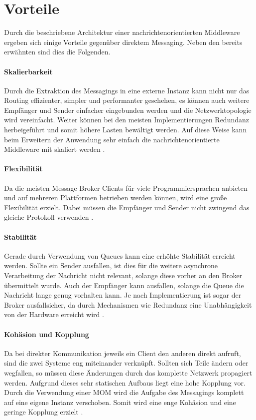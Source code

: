 \label{Message Broker:advantages}
\section{Vorteile}
Durch die beschriebene Architektur einer nachrichtenorientierten Middleware
ergeben sich einige Vorteile gegenüber direktem Messaging. Neben den bereits
erwähnten sind dies die Folgenden.

\paragraph{Skalierbarkeit}
Durch die Extraktion des Messagings in eine externe Instanz kann nicht nur das
Routing effizienter, simpler und performanter geschehen, es können auch weitere
Empfänger und Sender einfacher eingebunden werden und die Netzwerktopologie wird
vereinfacht. Weiter können bei den meisten Implementierungen Redundanz
herbeigeführt und somit höhere Lasten bewältigt werden. Auf diese Weise kann beim
Erweitern der Anwendung sehr einfach die nachrichtenorientierte Middleware mit
skaliert werden \cite{curry2004message}.
\paragraph{Flexibilität}
Da die meisten Message Broker Clients für viele Programmiersprachen anbieten
und auf mehreren Plattformen betrieben werden können, wird eine große Flexibilität
erzielt. Dabei müssen die Empfänger und Sender nicht zwingend das gleiche
Protokoll verwenden \cite{dobbelaere2017kafka}.
\paragraph{Stabilität}
Gerade durch Verwendung von Queues kann eine erhöhte Stabilität erreicht werden.
Sollte ein Sender ausfallen, ist dies für die weitere asynchrone Verarbeitung
der Nachricht nicht relevant, solange diese vorher an den Broker übermittelt
wurde. Auch der Empfänger kann ausfallen, solange die Queue die Nachricht lange
genug vorhalten kann. Je nach Implementierung ist sogar der Broker ausfallsicher,
da durch Mechanismen wie Redundanz eine Unabhängigkeit von der Hardware erreicht wird \cite{dobbelaere2017kafka}.
\paragraph{Kohäsion und Kopplung}
Da bei direkter Kommunikation jeweils ein Client den anderen direkt aufruft,
sind die zwei Systeme eng miteinander verknüpft. Sollten sich Teile ändern oder
wegfallen, so müssen diese Änderungen durch das komplette Netzwerk propagiert werden.
Aufgrund dieses sehr statischen Aufbaus liegt eine hohe Kopplung vor.
Durch die Verwendung einer MOM wird die Aufgabe des Messagings komplett auf eine
eigene Instanz verschoben. Somit wird eine enge Kohäsion und eine geringe
Kopplung erzielt \cite{curry2004message}.
